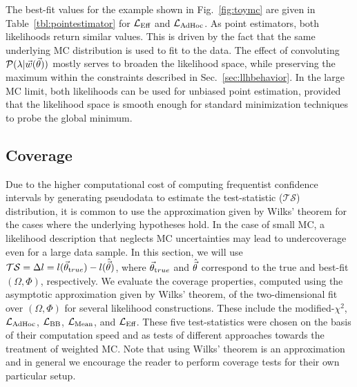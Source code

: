 The best-fit values for the example shown in Fig.~\ref{fig:toymc} are given in Table~\ref{tbl:pointestimator} for $\mathcal{L}_\textmd{Eff}$ and $\mathcal{L}_{\textmd{AdHoc}}$. As point estimators, both likelihoods return similar values. This is driven by the fact that the same underlying MC distribution is used to fit to the data. The effect of convoluting $\mathcal{P}(\lambda|\vec{w}(\vec{\theta}))$ mostly serves to broaden the likelihood space, while preserving the maximum within the constraints described in Sec.~\ref{sec:llhbehavior}. In the large MC limit, both likelihoods can be used for unbiased point estimation, provided that the likelihood space is smooth enough for standard minimization techniques to probe the global minimum.

\subsection{Coverage}
\label{sec:coverage}
Due to the higher computational cost of computing frequentist confidence intervals by generating pseudodata to estimate the test-statistic ($\mathcal{TS}$) distribution, it is common to use the approximation given by Wilks' theorem for the cases where the underlying hypotheses hold. In the case of small MC, a likelihood description that neglects MC uncertainties may lead to undercoverage even for a large data sample. In this section, we will use  $\mathcal{TS}=\Delta l=l(\vec{\theta}_{\textrm true})-l(\hat{\vec{\theta}})$, where $\vec{\theta}_{\textrm true}$ and $\hat{\vec{\theta}}$ correspond to the true and best-fit $(\Omega, \Phi)$, respectively. We evaluate the coverage properties, computed using the asymptotic approximation given by Wilks' theorem, of the two-dimensional fit over $(\Omega, \Phi)$ for several likelihood constructions. These include the modified-$\chi^2$, $\mathcal{L}_{\textmd{AdHoc}}$, $\mathcal{L}_{\textmd{BB}}$, $\mathcal{L}_{\textmd{Mean}}$, and $\mathcal{L}_\textmd{Eff}$. These five test-statistics were chosen on the basis of their computation speed and as tests of different approaches towards the treatment of weighted MC. Note that using Wilks' theorem is an approximation and in general we encourage the reader to perform coverage tests for their own particular setup.

